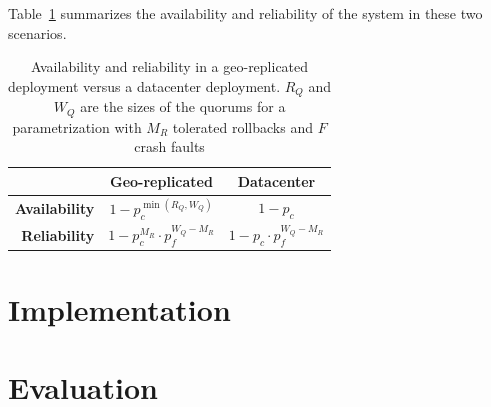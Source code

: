 Table~\ref{tab:parametrization} summarizes the availability and
reliability of the system in these two scenarios.

\begin{table}[ht]
    \centering
    \caption{Availability and reliability in a geo-replicated
    deployment versus a datacenter deployment. $R_Q$ and $W_Q$
    are the sizes of the quorums for a parametrization with $M_R$
    tolerated rollbacks and $F$ crash faults}\label{tab:parametrization}
    \begin{tabular}{|r||c|c|}
        \hline
        & \textbf{Geo-replicated} & \textbf{Datacenter} \\ \hline
        \textbf{Availability} & $1 - p_c^{\min(R_Q, W_Q)}$ & $1 - p_c$ \\ \hline
        \textbf{Reliability}  & $1 - p_c^{M_R} \cdot p_f^{W_Q - M_R}$ & $1 - p_c \cdot p_f^{W_Q - M_R}$ \\ \hline
    \end{tabular}\label{tab:parametrization}
\end{table}


\section{Implementation}\label{sec:r2s2implementation}


\section{Evaluation}\label{sec:r2s2evaluation}

